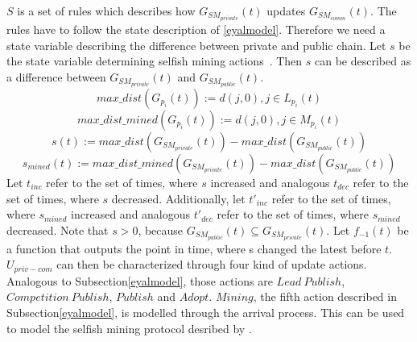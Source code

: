$S$ is a set of rules which describes how $G_{SM_{private}}(t)$ updates $G_{SM_{comm}}(t)$. The rules have to follow the state description of \citeauthor{eyal}\ref{eyalmodel}. Therefore we need a state variable describing the difference between private and public chain.
Let $s$ be the state variable determining selfish mining actions~\citep{eyal}.
Then $s$ can be described as a difference between $G_{SM_{private}}(t)$ and $G_{SM_{public}}(t)$.
\begin{equation}
max\_ dist(G_{p_i}(t)) := d(j,0), j \in L_{p_i}(t)
\end{equation}
\begin{equation}
max\_ dist\_mined(G_{p_i}(t)) := d(j,0), j \in M_{p_i}(t)
\end{equation}
\begin{equation}
s(t) := max\_ dist(G_{SM_{private}}(t)) - max\_ dist(G_{SM_{public}}(t))
\end{equation}
\begin{equation}
s_{mined}(t) := max\_ dist\_mined(G_{SM_{private}}(t)) - max\_ dist(G_{SM_{public}}(t))
\end{equation}
Let $t_{inc}$ refer to the set of times, where $s$ increased and analogous $t_{dec}$ refer to the set of times, where $s$ decreased.
Additionally, let $t'_{inc}$ refer to the set of times, where $s_{mined}$ increased and analogous $t'_{dec}$ refer to the set of times, where $s_{mined}$ decreased.
Note that $s>0$, because $G_{SM_{public}}(t) \subseteq G_{SM_{private}}(t)$.
Let $f_{-1}(t)$ be a function that outputs the point in time, where s changed the latest before $t$.
$U_{priv-com}$ can then be characterized through four kind of update actions. Analogous to Subsection\ref{eyalmodel}, those actions are $Lead~Publish$, $Competition~Publish$, $Publish$ and $Adopt$. $Mining$, the fifth action described in Subsection\ref{eyalmodel}, is modelled through the arrival process.
This can be used to model the selfish mining protocol desribed by \citeauthor{eyal}.

